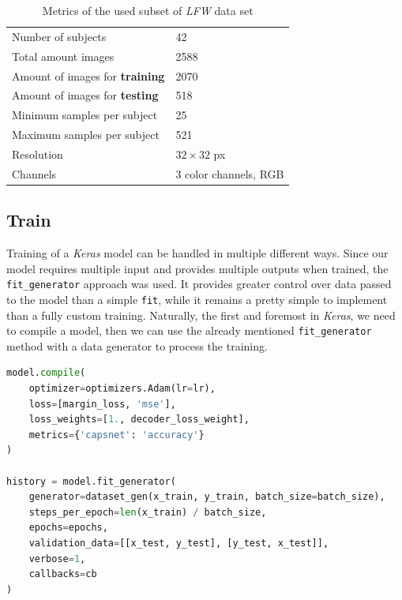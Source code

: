 \begin{table}[ht]
    \centering
    \begin{tabularx}{.8\textwidth}{l|X}
        \toprule
        Number of subjects & \num{42} \\
        Total amount images & \num{2588} \\
        Amount of images for \textbf{training} & \num{2070} \\
        Amount of images for \textbf{testing} & \num{518} \\
        Minimum samples per subject & \num{25} \\
        Maximum samples per subject & \num{521} \\
        Resolution & $32\times32$ px \\
        Channels & 3 color channels, RGB \\
        \bottomrule
    \end{tabularx}
    \caption{Metrics of the used subset of \textit{LFW} data set}
\end{table}

\subsection{Train}

Training of a \textit{Keras} model can be handled in multiple different ways. Since our model requires multiple input and provides multiple outputs when trained, the \texttt{fit\_generator} approach was used. It provides greater control over data passed to the model than a simple \texttt{fit}, while it remains a pretty simple to implement than a fully custom training. Naturally, the first and foremost in \textit{Keras}, we need to compile a model, then we can use the already mentioned \texttt{fit\_generator} method with a data generator to process the training.


\begin{lstlisting}[language=Python, caption=Training a \textit{Keras} mode using \texttt{fit\_generator}]
model.compile(
    optimizer=optimizers.Adam(lr=lr),
    loss=[margin_loss, 'mse'],
    loss_weights=[1., decoder_loss_weight],
    metrics={'capsnet': 'accuracy'}
)

history = model.fit_generator(
    generator=dataset_gen(x_train, y_train, batch_size=batch_size),
    steps_per_epoch=len(x_train) / batch_size,
    epochs=epochs,
    validation_data=[[x_test, y_test], [y_test, x_test]],
    verbose=1,
    callbacks=cb
)
\end{lstlisting}

